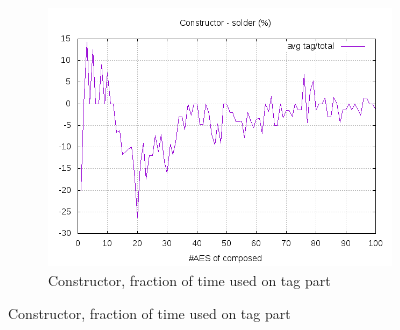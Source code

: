 \documentclass[10pt,a4paper]{article}
\begin{document}
\begin{figure}[h]
\begin{subfigure}[t]{0.3\textwidth}
        \includegraphics[width=\textwidth]{const_solder_frac}
        \caption{Constructor, fraction of time used on tag part}
    \end{subfigure}


\end{figure}
\end{document}
